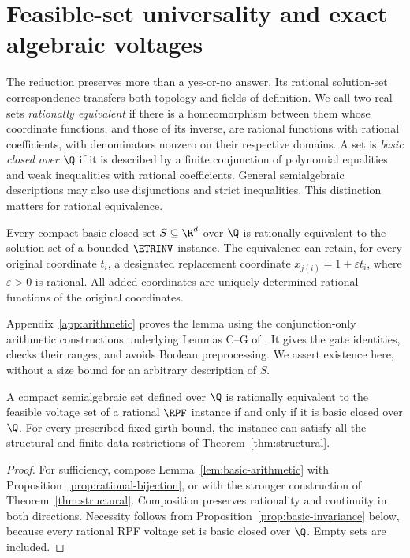 \section{Feasible-set universality and exact algebraic voltages}
\label{sec:algebraic}

The reduction preserves more than a yes-or-no answer. Its rational
solution-set correspondence transfers both topology and fields of definition.
We call two real sets \emph{rationally equivalent} if there is a
homeomorphism between them whose coordinate functions, and those of its
inverse, are rational functions with rational coefficients, with denominators
nonzero on their respective domains.
A set is \emph{basic closed over $\Q$} if it is described by a finite
conjunction of polynomial equalities and weak inequalities with rational
coefficients. General semialgebraic descriptions may also use disjunctions
and strict inequalities. This distinction matters for rational equivalence.

\begin{lemma}
\label{lem:basic-arithmetic}
Every compact basic closed set $S\subseteq\R^d$ over $\Q$ is rationally
equivalent to the solution set of a bounded $\ETRINV$ instance.
The equivalence can retain, for every original coordinate $t_i$, a designated
replacement coordinate $x_{j(i)}=1+\varepsilon t_i$, where
$\varepsilon>0$ is rational. All added coordinates are uniquely determined
rational functions of the original coordinates.
\end{lemma}

Appendix~\ref{app:arithmetic} proves the lemma using the conjunction-only
arithmetic constructions underlying Lemmas C--G of
\citet{AbrahamsenMiltzow2019}. It gives the gate identities, checks their
ranges, and avoids Boolean preprocessing. We assert existence here, without
a size bound for an arbitrary description of $S$.

\begin{theorem}
\label{thm:universality}
A compact semialgebraic set defined over $\Q$ is rationally equivalent
to the feasible voltage set of a rational $\RPF$ instance if and only if
it is basic closed over $\Q$.
For every prescribed fixed girth bound, the instance can satisfy all the
structural and finite-data restrictions of Theorem~\ref{thm:structural}.
\end{theorem}
\begin{proof}
For sufficiency, compose Lemma~\ref{lem:basic-arithmetic} with
Proposition~\ref{prop:rational-bijection}, or with the stronger construction
of Theorem~\ref{thm:structural}. Composition preserves rationality and
continuity in both directions. Necessity follows from
Proposition~\ref{prop:basic-invariance} below, because every rational RPF
voltage set is basic closed over $\Q$. Empty sets are included.
\end{proof}

